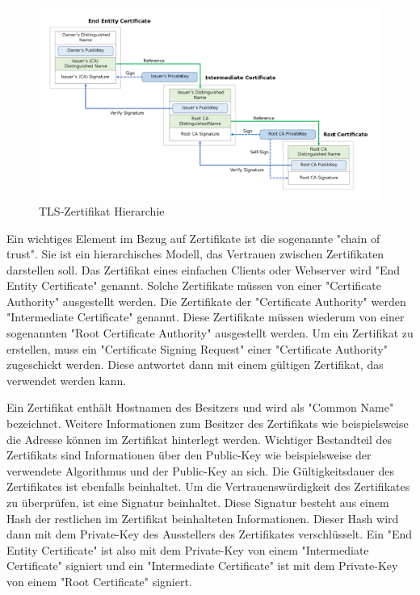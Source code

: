 \begin{figure}[H]
    \centering
    \includegraphics{media/OpenSSL/cert.png}
    \caption{TLS-Zertifikat Hierarchie \cite{ChainOfTrust}}
\end{figure}

Ein wichtiges Element im Bezug auf Zertifikate ist die sogenannte "chain of trust". Sie ist ein hierarchisches Modell, das Vertrauen zwischen Zertifikaten darstellen soll. Das Zertifikat eines einfachen Clients oder Webserver wird "End Entity Certificate" genannt. Solche Zertifikate müssen von einer "Certificate Authority" ausgestellt werden. Die Zertifikate der "Certificate Authority" werden "Intermediate Certificate" genannt. Diese Zertifikate müssen wiederum von einer sogenannten "Root Certificate Authority" ausgestellt werden. Um ein Zertifikat zu erstellen, muss ein "Certificate Signing Request" einer "Certificate Authority" zugeschickt werden. Diese antwortet dann mit einem gültigen Zertifikat, das verwendet werden kann.

Ein Zertifikat enthält Hostnamen des Besitzers und wird als "Common Name" bezeichnet. Weitere Informationen zum Besitzer des Zertifikats wie beispielsweise die Adresse können im Zertifikat hinterlegt werden. Wichtiger Bestandteil des Zertifikats sind Informationen über den Public-Key wie beispielsweise der verwendete Algorithmus und der Public-Key an sich. Die Gültigkeitsdauer des Zertifikates ist ebenfalls beinhaltet. Um die Vertrauenswürdigkeit des Zertifikates zu überprüfen, ist eine Signatur beinhaltet. Diese Signatur besteht aus einem Hash der restlichen im Zertifikat beinhalteten Informationen. Dieser Hash wird dann mit dem Private-Key des Ausstellers des Zertifikates verschlüsselt. Ein "End Entity Certificate" ist also mit dem Private-Key von einem "Intermediate Certificate" signiert und ein "Intermediate Certificate" ist mit dem Private-Key von einem "Root Certificate" signiert. \cite{ChainOfTrust}

